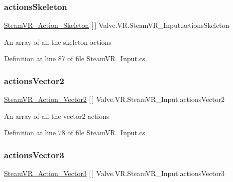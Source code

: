 \subsubsection{\texorpdfstring{actionsSkeleton}{actionsSkeleton}}
{\footnotesize\ttfamily \mbox{\hyperlink{class_valve_1_1_v_r_1_1_steam_v_r___action___skeleton}{Steam\+V\+R\+\_\+\+Action\+\_\+\+Skeleton}} \mbox{[}$\,$\mbox{]} Valve.\+V\+R.\+Steam\+V\+R\+\_\+\+Input.\+actions\+Skeleton\hspace{0.3cm}{\ttfamily [static]}}



An array of all the skeleton actions 



Definition at line 87 of file Steam\+V\+R\+\_\+\+Input.\+cs.

\mbox{\label{class_valve_1_1_v_r_1_1_steam_v_r___input_a470c062f3b57842e415c127f0b3d8e30}} 
\subsubsection{\texorpdfstring{actionsVector2}{actionsVector2}}
{\footnotesize\ttfamily \mbox{\hyperlink{class_valve_1_1_v_r_1_1_steam_v_r___action___vector2}{Steam\+V\+R\+\_\+\+Action\+\_\+\+Vector2}} \mbox{[}$\,$\mbox{]} Valve.\+V\+R.\+Steam\+V\+R\+\_\+\+Input.\+actions\+Vector2\hspace{0.3cm}{\ttfamily [static]}}



An array of all the vector2 actions 



Definition at line 78 of file Steam\+V\+R\+\_\+\+Input.\+cs.

\mbox{\label{class_valve_1_1_v_r_1_1_steam_v_r___input_a6a25b2f5d1f958d75e18445b21043968}} 
\subsubsection{\texorpdfstring{actionsVector3}{actionsVector3}}
{\footnotesize\ttfamily \mbox{\hyperlink{class_valve_1_1_v_r_1_1_steam_v_r___action___vector3}{Steam\+V\+R\+\_\+\+Action\+\_\+\+Vector3}} \mbox{[}$\,$\mbox{]} Valve.\+V\+R.\+Steam\+V\+R\+\_\+\+Input.\+actions\+Vector3\hspace{0.3cm}{\ttfamily [static]}}



